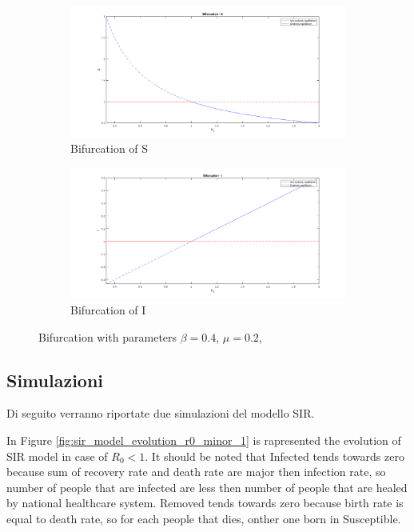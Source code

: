 \begin{figure}[h!]
    \label{fig:bifurcation}
    \begin{subfigure}{.5\textwidth}
        \centering
        \includegraphics[width=\linewidth]{Figure/bifurcation_s.png}  
        \caption{Bifurcation of S}
        \label{fig:bifurcation_s}
    \end{subfigure}
    \begin{subfigure}{.5\textwidth}
        \centering
        \includegraphics[width=\linewidth]{Figure/bifurcation_i.png}  
        \caption{Bifurcation of I}
        \label{fig:bifurcation_i}
    \end{subfigure}
    \caption{Bifurcation with parameters $\beta = 0.4$, $\mu = 0.2$,}
\end{figure}

\break


\subsection{Simulazioni}
Di seguito verranno riportate due simulazioni del modello SIR.

In Figure \ref{fig:sir_model_evolution_r0_minor_1} is rapresented the evolution of SIR model in case of $R_0 < 1$. It should be noted that Infected tends towards zero because sum of recovery rate and death rate are major then infection rate, so number of people that are infected are less then number of people that are healed by national healthcare system. Removed tends towards zero because birth rate is equal to death rate, so for each people that dies, onther one born in Susceptible.


